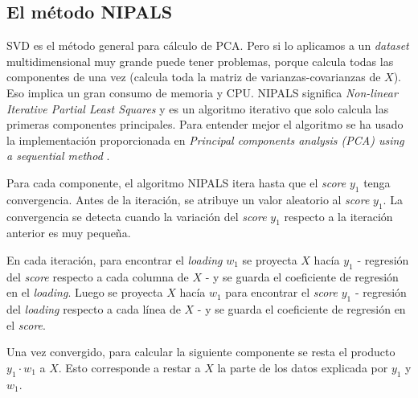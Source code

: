 \documentclass[11pt,spanish,listoffigures,listoftables]{tfgetsinf}
\begin{document}
    \subsection{El método NIPALS}
    SVD es el método general para cálculo de PCA. Pero si lo aplicamos a un {\em dataset} multidimensional muy grande puede tener problemas, porque calcula todas las componentes de una vez (calcula toda la matriz de varianzas-covarianzas de \(X\)). Eso implica un gran consumo de memoria y CPU. NIPALS significa {\em Non-linear Iterative Partial Least Squares} y es un algoritmo iterativo que solo calcula las primeras componentes principales. Para entender mejor el algoritmo se ha usado la implementación proporcionada en \textit{Principal components analysis (PCA) using a sequential method} \cite{nipals}.
    
    Para cada componente, el algoritmo NIPALS itera hasta que el {\em score} \(y_{1}\) tenga convergencia. Antes de la iteración, se atribuye un valor aleatorio al {\em score} \(y_{1}\). La convergencia se detecta cuando la variación del {\em score} \(y_{1}\) respecto a la iteración anterior es muy pequeña. 
    
     En cada iteración, para encontrar el {\em loading} \(w_{1}\) se proyecta \(X\) hacía \(y_{1}\) - regresión del {\em score} respecto a cada columna de \(X\) - y se guarda el coeficiente de regresión en el {\em loading}. Luego se proyecta \(X\) hacía \(w_{1}\) para encontrar el {\em score} \(y_{1}\) - regresión del {\em loading} respecto a cada línea de \(X\) - y se guarda el coeficiente de regresión en el {\em score}. 
    
    Una vez convergido, para calcular la siguiente componente se resta el producto \(y_{1} \cdot w_{1}\) a \(X\). Esto corresponde a restar a \(X\) la parte de los datos explicada por \(y_{1}\) y \(w_{1}\).
    
\end{document}
